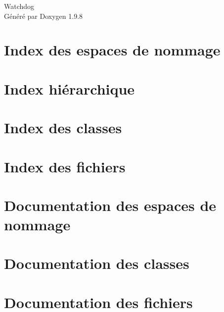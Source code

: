 \documentclass[twoside]{book}
\newcommand{\+}{\discretionary{\mbox{\scriptsize$\hookleftarrow$}}{}{}}
\newcommand{\clearemptydoublepage}{%
    \newpage{\pagestyle{empty}\cleardoublepage}%
  }
\begin{document}
  \raggedbottom
    \hypersetup{pageanchor=false,
                bookmarksnumbered=true,
                pdfencoding=unicode
               }
  \begin{titlepage}
  \vspace*{7cm}
  \begin{center}%
  {\Large Watchdog}\\
  \vspace*{1cm}
  {\large Généré par Doxygen 1.9.8}\\
  \end{center}
  \end{titlepage}
  \clearemptydoublepage
  \tableofcontents
  \clearemptydoublepage
  \hypersetup{pageanchor=true}
\chapter{Index des espaces de nommage}

\chapter{Index hiérarchique}

\chapter{Index des classes}

\chapter{Index des fichiers}

\chapter{Documentation des espaces de nommage}

\chapter{Documentation des classes}


\chapter{Documentation des fichiers}







  \backmatter
  \newpage
  \clearemptydoublepage
  \printindex
\end{document}
